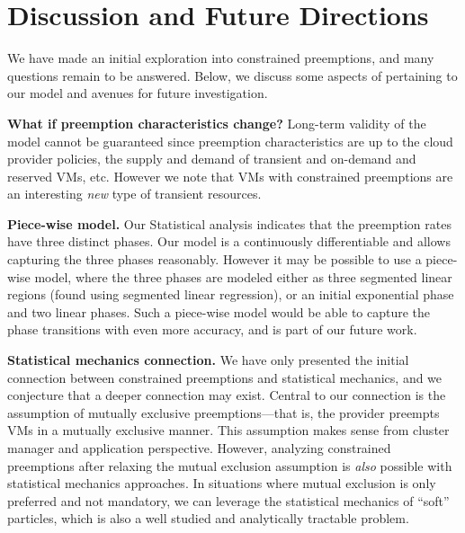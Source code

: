 \section{Discussion and Future Directions}

We have made an initial exploration into constrained preemptions, and many questions remain to be answered.
Below, we discuss some aspects of pertaining to our model and avenues for future investigation.

\noindent \textbf{What if preemption characteristics change?} Long-term validity of the model cannot be guaranteed since preemption characteristics are up to the cloud provider policies, the supply and demand of transient and on-demand and reserved VMs, etc.
However we note that VMs with constrained preemptions are an interesting \emph{new} type of transient resources. 

\noindent \textbf{Piece-wise model.} Our Statistical analysis indicates that the preemption rates have three distinct phases.
Our model is a continuously differentiable and allows capturing the three phases reasonably. 
However it may be possible to use a piece-wise model, where the three phases are modeled either as three segmented linear regions (found using segmented linear regression), or an initial exponential phase and two linear phases.
Such a piece-wise model would be able to capture the phase transitions with even more accuracy, and is part of our future work. 

\noindent \textbf{Statistical mechanics connection.} We have only presented the initial connection between constrained preemptions and statistical mechanics, and we conjecture that a deeper connection may exist. 
Central to our connection is the assumption of mutually exclusive preemptions---that is, the provider preempts VMs in a mutually exclusive manner.
This assumption makes sense from cluster manager and application perspective. 
However,  analyzing constrained preemptions after relaxing the mutual exclusion assumption is \emph{also} possible with statistical mechanics approaches.
In situations where mutual exclusion is only preferred and not mandatory, we can leverage the statistical mechanics of ``soft'' particles, which is also a well studied and analytically tractable problem. 

